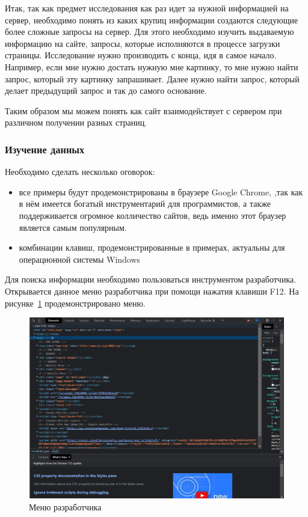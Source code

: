 Итак, так как предмет исследования как раз идет за нужной информацией на сервер, 
необходимо понять из каких крупиц информации создаются следующие более сложные запросы на сервер.
Для этого необходимо изучить выдаваемую информацию на сайте, запросы, которые исполняются в процессе загрузки страницы.
Исследование нужно производить с конца, идя в самое начало.
Например, если мне нужно достать нужную мне картинку, то мне нужно найти запрос, который эту картинку запрашивает.
Далее нужно найти запрос, который делает предыдущий запрос и так до самого основание.

Таким образом мы можем понять как сайт взаимодействует с сервером при различном получении разных страниц.

\subsubsection{Изучение данных}
Необходимо сделать несколько оговорок:
\begin{itemize}
    \item все примеры будут продемонстрированы в браузере Google Chrome, ,так как в нём имеется богатый инструментарий для программистов, а также поддерживается огромное колличество сайтов, ведь именно этот браузер является самым популярным. \cite{broser-popularity-cite}
    \item комбинации клавиш, продемонстрированные в примерах, актуальны для операционной системы Windows
\end{itemize}

Для поиска информации необходимо пользоваться инструментом разработчика. Открывается данное меню разработчика при помощи нажатия клавиши F12. 
На рисунке~\ref{chrome-tools-pic} продемонстрировано меню.

\begin{figure}
    \includegraphics[scale=0.5]{imgs/chrome-tools}
    \caption{Меню разработчика}
    \label{chrome-tools-pic}
\end{figure}

